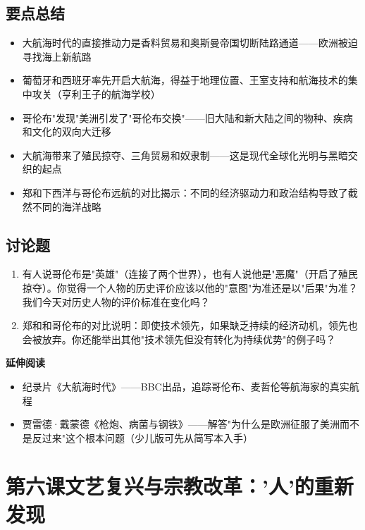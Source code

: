 \documentclass[a4paper,12pt]{ctexart}
\begin{document}
\subsection*{要点总结}
\begin{itemize}
  \item 大航海时代的直接推动力是香料贸易和奥斯曼帝国切断陆路通道——欧洲被迫寻找海上新航路
  \item 葡萄牙和西班牙率先开启大航海，得益于地理位置、王室支持和航海技术的集中攻关（亨利王子的航海学校）
  \item 哥伦布"发现"美洲引发了"哥伦布交换"——旧大陆和新大陆之间的物种、疾病和文化的双向大迁移
  \item 大航海带来了殖民掠夺、三角贸易和奴隶制——这是现代全球化光明与黑暗交织的起点
  \item 郑和下西洋与哥伦布远航的对比揭示：不同的经济驱动力和政治结构导致了截然不同的海洋战略
\end{itemize}

\subsection*{讨论题}
\begin{enumerate}
  \item 有人说哥伦布是"英雄"（连接了两个世界），也有人说他是"恶魔"（开启了殖民掠夺）。你觉得一个人物的历史评价应该以他的"意图"为准还是以"后果"为准？我们今天对历史人物的评价标准在变化吗？
  \item 郑和和哥伦布的对比说明：即使技术领先，如果缺乏持续的经济动机，领先也会被放弃。你还能举出其他"技术领先但没有转化为持续优势"的例子吗？
\end{enumerate}

\vspace{0.3cm}
\textcolor{blue!70!black}{\textbf{延伸阅读}}
\begin{itemize}
  \item 纪录片《大航海时代》——BBC出品，追踪哥伦布、麦哲伦等航海家的真实航程
  \item 贾雷德·戴蒙德《枪炮、病菌与钢铁》——解答"为什么是欧洲征服了美洲而不是反过来"这个根本问题（少儿版可先从简写本入手）
\end{itemize}

\newpage

\section{\textcolor{orange!80!black}{第六课\quad 文艺复兴与宗教改革：'人'的重新发现}}
\end{document}
